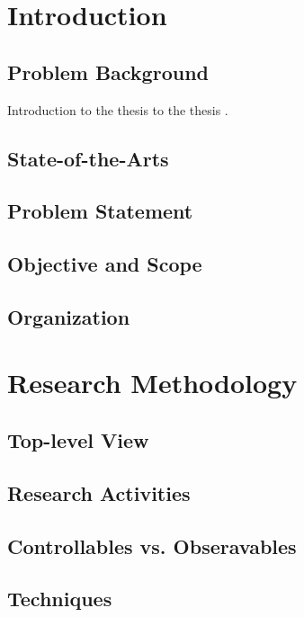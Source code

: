 \documentclass{utmthesis}
\begin{document}
\listofsymbols
{}



\onehalfspacing
\mainmatter


\chapter{Introduction}
\section{Problem Background}
Introduction to the thesis \cite{b2} to the thesis \cite{okamoto2004improved}. 
\section{State-of-the-Arts}
\section{Problem Statement}
\section{Objective and Scope}
\section{Organization}




\chapter{Research Methodology}
\section{Top-level View}
\section{Research Activities}
\section{Controllables vs. Obseravables}
\section{Techniques}
\end{document}
